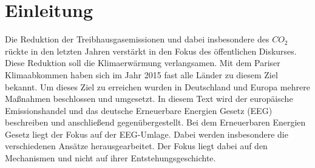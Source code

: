\chapter{Einleitung}
Die Reduktion der Treibhausgasemissionen und dabei insbesondere des $CO_2$ rückte in den letzten Jahren verstärkt in den Fokus des öffentlichen Diskurses.
Diese Reduktion soll die Klimaerwärmung verlangsamen.
Mit dem Pariser Klimaabkommen haben sich im Jahr 2015 fast alle Länder zu diesem Ziel bekannt.
Um dieses Ziel zu erreichen wurden in Deutschland und Europa mehrere Maßnahmen beschlossen und umgesetzt.
In diesem Text wird der europäische Emissionshandel und das deutsche Erneuerbare Energien Gesetz (EEG) beschreiben und anschließend gegenübergestellt. 
Bei dem Erneuerbaren Energien Gesetz liegt der Fokus auf der EEG-Umlage.
Dabei werden insbesondere die verschiedenen Ansätze herausgearbeitet.
Der Fokus liegt dabei auf den Mechanismen und nicht auf ihrer Entstehungsgeschichte.